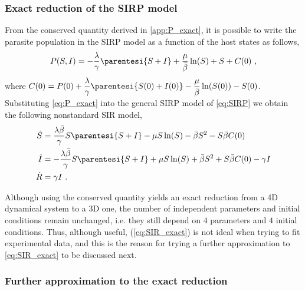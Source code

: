 \subsubsection{Exact reduction of the SIRP model} \label{sec:exactred}

From the conserved quantity derived in \cref{app:P_exact}, it is possible
to write the parasite population in the SIRP model as a function of the host
states as follows,
\begin{equation}\label{eq:P_exact}
    P(S,I)=-\frac{\lambda}{\gamma}\parentesi{S+I} +
    \frac{\mu}{\bar{\beta}}\ln(S) + S + C(0) \ ,
\end{equation}
where $C(0)=P(0)+\displaystyle\frac{\lambda}{\gamma}\parentesi{S(0)+I(0)} -
    \frac{\mu}{\bar{\beta}}\ln(S(0)) - S(0)$.\\

Substituting \cref{eq:P_exact} into the general SIRP model of
\cref{eq:SIRP} we obtain the following nonstandard SIR model,
\begin{equation}\label{eq:SIR_exact}
    \begin{aligned}
        \dot{S} & = \frac{\lambda\bar{\beta}}{\gamma}S\parentesi{S+I} - \mu
        S\ln(S) - \bar{\beta} S^2 - S\bar{\beta} C(0)                        \\
        \dot{I} & = -\frac{\lambda\bar{\beta}}{\gamma}S\parentesi{S+I} + \mu
        S\ln(S) + \bar{\beta} S^2 + S\bar{\beta} C(0) -\gamma I              \\
        \dot{R} & =\gamma I \ .
    \end{aligned}
\end{equation}

Although using the conserved quantity yields an exact reduction from a 4D
dynamical system to a 3D one, the number of independent parameters and initial
conditions remain unchanged, i.e. they still depend on $4$ parameters and $4$
initial conditions. Thus, although useful, (\cref{eq:SIR_exact}) is not ideal
when trying to fit experimental data, and this is the reason for trying a
further approximation to \cref{eq:SIR_exact} to be discussed next.

\subsubsection{Further approximation to the exact reduction}
\label{sec:exactredapp}

